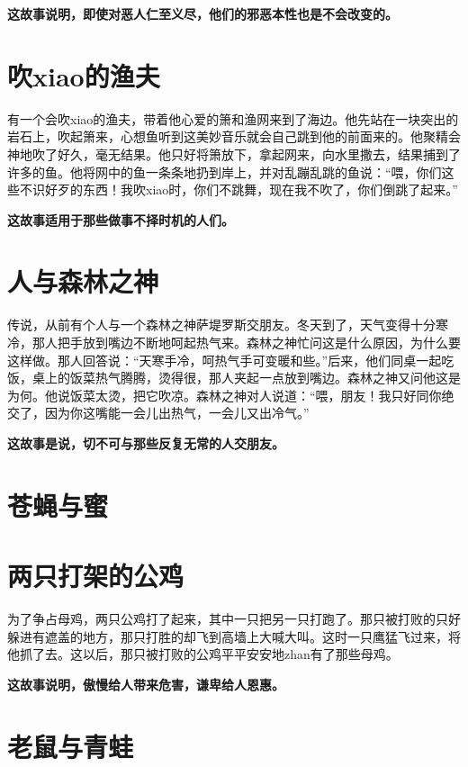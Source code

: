{\bfseries \color{red}这故事说明，即使对恶人仁至义尽，他们的邪恶本性也是不会改变的。}

\section{吹xiao的渔夫}

有一个会吹xiao的渔夫，带着他心爱的箫和渔网来到了海边。他先站在一块突出的岩石上，吹起箫来，心想鱼听到这美妙音乐就会自己跳到他的前面来的。他聚精会神地吹了好久，毫无结果。他只好将箫放下，拿起网来，向水里撒去，结果捕到了许多的鱼。他将网中的鱼一条条地扔到岸上，并对乱蹦乱跳的鱼说：“喂，你们这些不识好歹的东西！我吹xiao时，你们不跳舞，现在我不吹了，你们倒跳了起来。”

{\bfseries \color{red}这故事适用于那些做事不择时机的人们。}

\section{人与森林之神}

传说，从前有个人与一个森林之神萨堤罗斯交朋友。冬天到了，天气变得十分寒冷，那人把手放到嘴边不断地呵起热气来。森林之神忙问这是什么原因，为什么要这样做。那人回答说：“天寒手冷，呵热气手可变暖和些。”后来，他们同桌一起吃饭，桌上的饭菜热气腾腾，烫得很，那人夹起一点放到嘴边。森林之神又问他这是为何。他说饭菜太烫，把它吹凉。森林之神对人说道：“喂，朋友！我只好同你绝交了，因为你这嘴能一会儿出热气，一会儿又出冷气。”

{\bfseries \color{red}这故事是说，切不可与那些反复无常的人交朋友。}

\section{苍蝇与蜜}



{\bfseries \color{red}}

\section{两只打架的公鸡}

为了争占母鸡，两只公鸡打了起来，其中一只把另一只打跑了。那只被打败的只好躲进有遮盖的地方，那只打胜的却飞到高墙上大喊大叫。这时一只鹰猛飞过来，将他抓了去。这以后，那只被打败的公鸡平平安安地zhan有了那些母鸡。

{\bfseries \color{red}这故事说明，傲慢给人带来危害，谦卑给人恩惠。}

\section{老鼠与青蛙}

